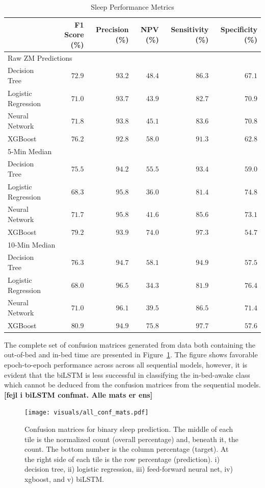 \documentclass[
  super,
  preprint,
  3p]{elsarticle}
\begin{document}
\hypertarget{tbl-sleep_performance}{}
\begin{longtable}{lrrrrr}
\caption{\label{tbl-sleep_performance}Sleep Performance Metrics }\tabularnewline

\toprule
 & F1 Score (\%) & Precision (\%) & NPV (\%) & Sensitivity (\%) & Specificity (\%) \\ 
\midrule
\multicolumn{6}{l}{Raw ZM Predictions} \\ 
\midrule
Decision Tree & $72.9$ & $93.2$ & $48.4$ & $86.3$ & $67.1$ \\ 
Logistic Regression & $71.0$ & $93.7$ & $43.9$ & $82.7$ & $70.9$ \\ 
Neural Network & $71.8$ & $93.8$ & $45.1$ & $83.6$ & $70.8$ \\ 
XGBoost & $76.2$ & $92.8$ & $58.0$ & $91.3$ & $62.8$ \\ 
\midrule
\multicolumn{6}{l}{5-Min Median} \\ 
\midrule
Decision Tree & $75.5$ & $94.2$ & $55.5$ & $93.4$ & $59.0$ \\ 
Logistic Regression & $68.3$ & $95.8$ & $36.0$ & $81.4$ & $74.8$ \\ 
Neural Network & $71.7$ & $95.8$ & $41.6$ & $85.6$ & $73.1$ \\ 
XGBoost & $79.2$ & $93.9$ & $74.0$ & $97.3$ & $54.7$ \\ 
\midrule
\multicolumn{6}{l}{10-Min Median} \\ 
\midrule
Decision Tree & $76.3$ & $94.7$ & $58.1$ & $94.9$ & $57.5$ \\ 
Logistic Regression & $68.0$ & $96.5$ & $34.3$ & $81.9$ & $76.4$ \\ 
Neural Network & $71.0$ & $96.1$ & $39.5$ & $86.5$ & $71.4$ \\ 
XGBoost & $80.9$ & $94.9$ & $75.8$ & $97.7$ & $57.6$ \\ 
\bottomrule
\end{longtable}

The complete set of confusion matrices generated from data both
containing the out-of-bed and in-bed time are presented in
Figure~\ref{fig-conf_mat}. The figure shows favorable epoch-to-epoch
performance across across all sequential models, however, it is evident
that the biLSTM is less successful in classifying the in-bed-awake class
which cannot be deduced from the confusion matrices from the sequential
models. \textbf{{[}fejl i biLSTM confmat. Alle mats er ens{]}}

\begin{figure}[b]

{\centering \texttt{[image: visuals/all\_conf\_mats.pdf]}

}

\caption{\label{fig-conf_mat}Confusion matrices for binary sleep
prediction. The middle of each tile is the normalized count (overall
percentage) and, beneath it, the count. The bottom number is the column
percentage (target). At the right side of each tile is the row
percentage (prediction). i) decision tree, ii) logistic regression, iii)
feed-forward neural net, iv) xgboost, and v) biLSTM.}

\end{figure}
\end{document}
